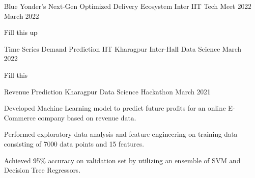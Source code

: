 

\begin{cventries}

  \cventry
    {Blue Yonder's Next-Gen Optimized Delivery Ecosystem} %
    {Inter IIT Tech Meet 2022} %
    {March 2022} %
    {} %
    {
      \begin{cvitems} %
        \item {Fill this up}
      \end{cvitems}
    }

  \cventry
    {Time Series Demand Prediction} %
    {IIT Kharagpur Inter-Hall Data Science} %
    {March 2022} %
    {} %
    {
      \begin{cvitems} %
        \item {Fill this}
      \end{cvitems}
    }

  \cventry
    {Revenue Prediction} %
    {Kharagpur Data Science Hackathon} %
    {March 2021} %
    {} %
    {
      \begin{cvitems} %
        \item {Developed Machine Learning model to predict future profits for an online E-Commerce company based on revenue data.}
        \item {Performed exploratory data analysis and feature engineering on training data consisting of 7000 data points and 15 features.}
        \item {Achieved 95\% accuracy on validation set by utilizing an ensemble of SVM and Decision Tree Regressors.}
      \end{cvitems}
    }


\end{cventries}
